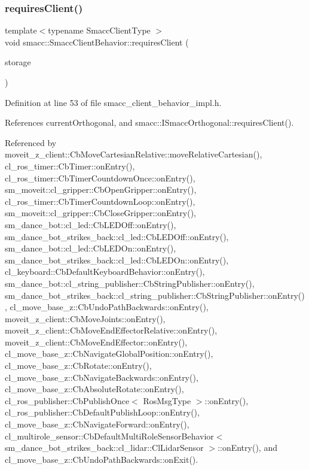 \subsubsection{\texorpdfstring{requires\+Client()}{requiresClient()}}
{\footnotesize\ttfamily template$<$typename Smacc\+Client\+Type $>$ \\
void smacc\+::\+Smacc\+Client\+Behavior\+::requires\+Client (\begin{DoxyParamCaption}\item[{Smacc\+Client\+Type $\ast$\&}]{storage }\end{DoxyParamCaption})}



Definition at line 53 of file smacc\+\_\+client\+\_\+behavior\+\_\+impl.\+h.



References current\+Orthogonal, and smacc\+::\+I\+Smacc\+Orthogonal\+::requires\+Client().



Referenced by moveit\+\_\+z\+\_\+client\+::\+Cb\+Move\+Cartesian\+Relative\+::move\+Relative\+Cartesian(), cl\+\_\+ros\+\_\+timer\+::\+Cb\+Timer\+::on\+Entry(), cl\+\_\+ros\+\_\+timer\+::\+Cb\+Timer\+Countdown\+Once\+::on\+Entry(), sm\+\_\+moveit\+::cl\+\_\+gripper\+::\+Cb\+Open\+Gripper\+::on\+Entry(), cl\+\_\+ros\+\_\+timer\+::\+Cb\+Timer\+Countdown\+Loop\+::on\+Entry(), sm\+\_\+moveit\+::cl\+\_\+gripper\+::\+Cb\+Close\+Gripper\+::on\+Entry(), sm\+\_\+dance\+\_\+bot\+::cl\+\_\+led\+::\+Cb\+L\+E\+D\+Off\+::on\+Entry(), sm\+\_\+dance\+\_\+bot\+\_\+strikes\+\_\+back\+::cl\+\_\+led\+::\+Cb\+L\+E\+D\+Off\+::on\+Entry(), sm\+\_\+dance\+\_\+bot\+::cl\+\_\+led\+::\+Cb\+L\+E\+D\+On\+::on\+Entry(), sm\+\_\+dance\+\_\+bot\+\_\+strikes\+\_\+back\+::cl\+\_\+led\+::\+Cb\+L\+E\+D\+On\+::on\+Entry(), cl\+\_\+keyboard\+::\+Cb\+Default\+Keyboard\+Behavior\+::on\+Entry(), sm\+\_\+dance\+\_\+bot\+::cl\+\_\+string\+\_\+publisher\+::\+Cb\+String\+Publisher\+::on\+Entry(), sm\+\_\+dance\+\_\+bot\+\_\+strikes\+\_\+back\+::cl\+\_\+string\+\_\+publisher\+::\+Cb\+String\+Publisher\+::on\+Entry(), cl\+\_\+move\+\_\+base\+\_\+z\+::\+Cb\+Undo\+Path\+Backwards\+::on\+Entry(), moveit\+\_\+z\+\_\+client\+::\+Cb\+Move\+Joints\+::on\+Entry(), moveit\+\_\+z\+\_\+client\+::\+Cb\+Move\+End\+Effector\+Relative\+::on\+Entry(), moveit\+\_\+z\+\_\+client\+::\+Cb\+Move\+End\+Effector\+::on\+Entry(), cl\+\_\+move\+\_\+base\+\_\+z\+::\+Cb\+Navigate\+Global\+Position\+::on\+Entry(), cl\+\_\+move\+\_\+base\+\_\+z\+::\+Cb\+Rotate\+::on\+Entry(), cl\+\_\+move\+\_\+base\+\_\+z\+::\+Cb\+Navigate\+Backwards\+::on\+Entry(), cl\+\_\+move\+\_\+base\+\_\+z\+::\+Cb\+Absolute\+Rotate\+::on\+Entry(), cl\+\_\+ros\+\_\+publisher\+::\+Cb\+Publish\+Once$<$ Ros\+Msg\+Type $>$\+::on\+Entry(), cl\+\_\+ros\+\_\+publisher\+::\+Cb\+Default\+Publish\+Loop\+::on\+Entry(), cl\+\_\+move\+\_\+base\+\_\+z\+::\+Cb\+Navigate\+Forward\+::on\+Entry(), cl\+\_\+multirole\+\_\+sensor\+::\+Cb\+Default\+Multi\+Role\+Sensor\+Behavior$<$ sm\+\_\+dance\+\_\+bot\+\_\+strikes\+\_\+back\+::cl\+\_\+lidar\+::\+Cl\+Lidar\+Sensor $>$\+::on\+Entry(), and cl\+\_\+move\+\_\+base\+\_\+z\+::\+Cb\+Undo\+Path\+Backwards\+::on\+Exit().


